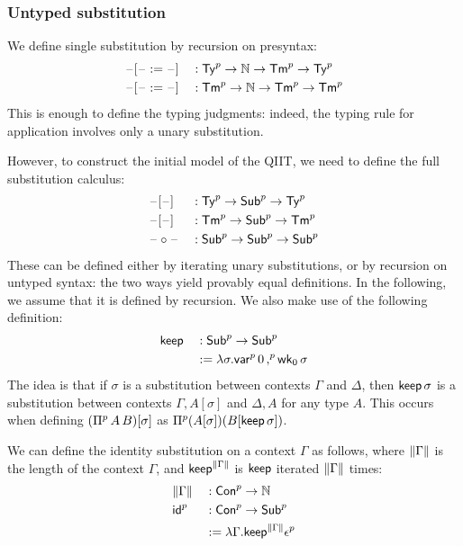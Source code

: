   \subsubsection{Untyped substitution}
  We define single substitution by recursion on presyntax:
\begin{alignat*}{5}
  & \blank[\blank := \blank] && : \Tyu\ra\N\ra\Tmu\ra\Tyu \\
  & \blank[\blank := \blank] && : \Tmu\ra\N\ra\Tmu\ra\Tmu
  \end{alignat*}
  This is enough to define the typing judgments: indeed, the typing rule for application
  involves only a unary substitution.

  However, to construct the initial model of the QIIT, we need to define
  the full substitution calculus:
\begin{alignat*}{5}
  & \blank[\blank] && : \Tyu\ra\Subu\ra\Tyu \\
  & \blank[\blank] && : \Tmu\ra\Subu\ra\Tmu \\
  & \blank \circ \blank && : \Subu\ra\Subu\ra \Subu
  \end{alignat*}
These can be defined either by iterating unary substitutions, or by recursion
on untyped syntax: the two ways yield provably equal definitions. In the
following, we assume that it is defined by recursion. We also make use of the
following definition:
  \begin{alignat*}{5}
  & \keep && : \Subu \ra \Subu \\
   &&& := \lambda \sigma. \varu\, 0 \,\consu\, \wkO\,\sigma
  \end{alignat*}
  The idea is that if $\sigma$ is a substitution between contexts $\Gamma$ and
  $\Delta$, then $\keep\,\sigma$ is a substitution between contexts $\Gamma, A[\sigma]$
  and $\Delta,A$ for any type $A$. This occurs when defining
  $(\Piu\,A\,B)[\sigma]$ as $\Piu (A[\sigma])(B[\keep \,\sigma])$.




  We can define the identity substitution on a context $\Gamma$ as follows,
  where $\length{\Gamma}$ is the length of the context $\Gamma$, and
  $\keep^{\length{\Gamma}}$ is $\keep$ iterated $\length{\Gamma}$ times:
\begin{alignat*}{5}
  & \length{\Gamma} && : \Conu\ra\N
  \\
  & \idu && : \Conu \ra \Subu \\
  & && := \lambda \Gamma.\keep^{\length{\Gamma}} \epsilonu
  \end{alignat*}


